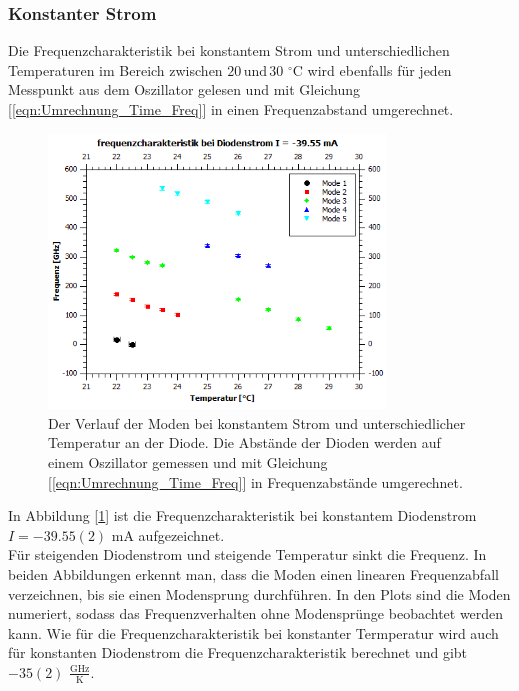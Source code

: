 \documentclass[a4paper,10pt]{scrartcl} %
\begin{document}
\subsubsection{Konstanter Strom}
Die Frequenzcharakteristik bei konstantem Strom und unterschiedlichen Temperaturen im Bereich zwischen $20 \, \text{und} \, 30 $ $^\circ{\text{C}}$ wird ebenfalls für jeden Messpunkt aus dem Oszillator gelesen und mit Gleichung [\ref{eqn:Umrechnung_Time_Freq}] in einen Frequenzabstand umgerechnet.
\begin{figure}
\centering
\includegraphics[width=0.8\textwidth]{Bilder/Frequenzchar_2.png}
\caption{Der Verlauf der Moden bei konstantem Strom  und unterschiedlicher Temperatur an der Diode. Die Abstände der Dioden werden auf einem Oszillator gemessen und mit Gleichung [\ref{eqn:Umrechnung_Time_Freq}] in Frequenzabstände umgerechnet.}
\label{fig:2_const_I}
\end{figure}
In Abbildung [\ref{fig:2_const_I}] ist die Frequenzcharakteristik bei konstantem Diodenstrom $I = -39.55(2)$ mA aufgezeichnet.\\
Für steigenden Diodenstrom und steigende Temperatur sinkt die Frequenz. In beiden Abbildungen erkennt man, dass die Moden einen linearen Frequenzabfall verzeichnen, bis sie einen Modensprung durchführen. In den Plots sind die Moden numeriert, sodass das Frequenzverhalten ohne Modensprünge beobachtet werden kann. Wie für die Frequenzcharakteristik bei konstanter Termperatur wird auch für konstanten Diodenstrom die Frequenzcharakteristik berechnet und gibt $-35(2)$ $\frac{\text{GHz}}{\text{K}}$.
\end{document}
